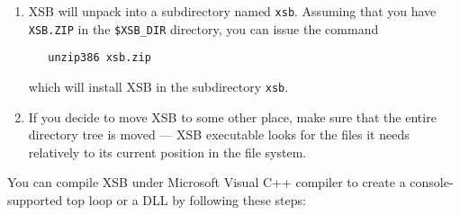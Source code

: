 \begin{enumerate}
\item 
   XSB will unpack into a subdirectory named {\tt xsb}.
   Assuming that you have {\tt XSB.ZIP} in the {\tt \$XSB\_DIR} directory,
   you can issue the command
\begin{verbatim}
   unzip386 xsb.zip
\end{verbatim}
   which will install XSB in the subdirectory {\tt xsb}.

   
 \item If you decide to move XSB to some other place, make sure that the
   entire directory tree is moved --- XSB executable looks for the files it
   needs relatively to its current position in the file system.

\end{enumerate}


You can compile XSB under Microsoft Visual C++ compiler 
to create a console-supported top loop or a DLL by following
these steps:

